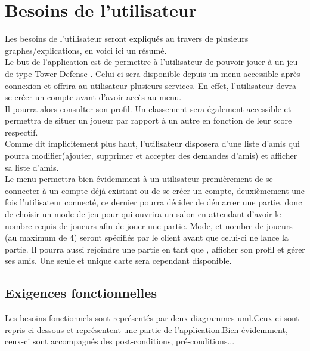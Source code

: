 \documentclass[12pt,a4paper]{article}
\begin{document}
\newpage
\section{Besoins de l'utilisateur}

 Les besoins de l'\gls{utilisateur} seront expliqués au travers de plusieurs graphes/explications, en voici ici un résumé.\\
Le but de l'application est de permettre à l'\gls{utilisateur} de pouvoir jouer à un jeu de type \gls{Tower Defense} . Celui-ci sera disponible depuis un menu accessible après connexion et offrira au \gls{utilisateur} plusieurs services. En effet, l'\gls{utilisateur} devra se créer un \gls{compte} avant d'avoir accès au menu.\\
Il pourra alors consulter son profil.
Un classement sera également accessible et permettra de situer un \gls{joueur} par rapport à un autre en fonction de leur score respectif.\\
Comme dit implicitement plus haut, l'\gls{utilisateur} disposera d'une liste d'amis qui pourra modifier(ajouter, supprimer et accepter des demandes d'amis) et afficher sa liste d'amis.\\

 Le menu permettra bien évidemment à un \gls{utilisateur} premièrement de se connecter à un \gls{compte} déjà existant ou de se créer un \gls{compte}, deuxièmement une fois l'\gls{utilisateur} connecté, ce dernier pourra décider de démarrer une partie, donc de choisir un mode de jeu pour qui ouvrira un salon en attendant d'avoir le nombre requis de \glspl{joueur} afin de jouer une partie. Mode, et nombre de \glspl{joueur} (au maximum de 4) seront spécifiés par le \gls{client} avant que celui-ci ne lance la partie. Il pourra aussi rejoindre une partie en tant que , afficher son profil et gérer ses amis. Une seule et unique carte sera cependant disponible.
 
\subsection{Exigences fonctionnelles}
Les besoins fonctionnels sont représentés par deux diagrammes uml.Ceux-ci sont repris ci-dessous et représentent une partie de l'application.Bien évidemment, ceux-ci sont accompagnés des post-conditions, pré-conditions...
\end{document}
